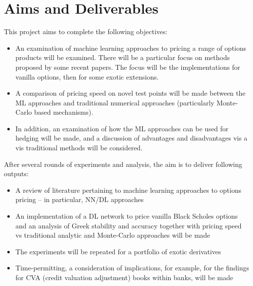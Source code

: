 \documentclass{report}
\begin{document}
\section{Aims and Deliverables}
This project aims to complete the following objectives:
\begin{itemize}
\item An examination of machine learning approaches to pricing a range of options products will be examined. There will be a particular focus on methods proposed by some recent papers. The focus will be the implementations for vanilla options, then for some exotic extensions.
\item A comparison of pricing speed on novel test points will be made between the ML approaches and traditional numerical approaches (particularly Monte-Carlo based mechanisms).
\item In addition, an examination of how the ML approaches can be used for hedging will be made, and a discussion of advantages and disadvantages vis a vis traditional methods will be considered.
\end{itemize}
After several rounds of experiments and analysis, the aim is to deliver following outputs:
\begin{itemize}
\item A review of literature pertaining to machine learning approaches to options pricing – in particular, NN/DL approaches
\item An implementation of a DL network to price vanilla Black Scholes options and an analysis of Greek stability and accuracy together with pricing speed vs traditional analytic and Monte-Carlo approaches will be made
\item The experiments will be repeated for a portfolio of exotic derivatives
\item Time-permitting, a consideration of implications, for example, for the findings for CVA (credit valuation adjustment) books within banks, will be made
\end{itemize}
\end{document}

